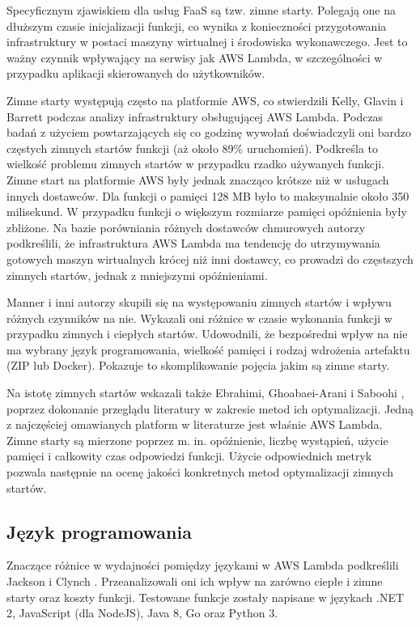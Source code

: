Specyficznym zjawiskiem dla usług FaaS są tzw. zimne starty. 
Polegają one na dłuższym czasie inicjalizacji funkcji, co wynika z konieczności przygotowania infrastruktury w postaci maszyny wirtualnej i środowiska wykonawczego. 
Jest to ważny czynnik wpływający na serwisy jak AWS Lambda, w szczególności w przypadku aplikacji skierowanych do użytkowników.

Zimne starty występują często na platformie AWS, co stwierdzili Kelly, Glavin i Barrett \cite{9284261} podczas analizy infrastruktury obsługującej AWS Lambda. 
Podczas badań z użyciem powtarzających się co godzinę wywołań doświadczyli oni bardzo częstych zimnych startów funkcji (aż około 89\% uruchomień). 
Podkreśla to wielkość problemu zimnych startów w przypadku rzadko używanych funkcji. 
Zimne start na platformie AWS były jednak znacząco krótsze niż w usługach innych dostawców. 
Dla funkcji o pamięci 128 MB było to maksymalnie około 350 milisekund. 
W przypadku funkcji o większym rozmiarze pamięci opóźnienia były zbliżone. 
Na bazie porówniania różnych dostawców chmurowych autorzy podkreślili, że infrastruktura AWS Lambda ma tendencję do utrzymywania gotowych maszyn wirtualnych krócej niż inni dostawcy, co prowadzi do częstszych zimnych startów, jednak z mniejszymi opóźnieniami.

Manner i inni autorzy \cite{8605777} skupili się na występowaniu zimnych startów i wpływu różnych czynników na nie. 
Wykazali oni różnice w czasie wykonania funkcji w przypadku zimnych i ciepłych startów. 
Udowodnili, że bezpośredni wpływ na nie ma wybrany język programowania, wielkość pamięci i rodzaj wdrożenia artefaktu (ZIP lub Docker). 
Pokazuje to skomplikowanie pojęcia jakim są zimne starty.

Na istotę zimnych startów wskazali także Ebrahimi, Ghoabaei-Arani i Saboohi \cite{EBRAHIMI2024103115}, poprzez dokonanie przeglądu literatury w zakresie metod ich optymalizacji. 
Jedną z najczęściej omawianych platform w literaturze jest właśnie AWS Lambda. 
Zimne starty są mierzone poprzez m. in. opóźnienie, liczbę wystąpień, użycie pamięci i całkowity czas odpowiedzi funkcji. 
Użycie odpowiednich metryk pozwala następnie na ocenę jakości konkretnych metod optymalizacji zimnych startów.

\subsection*{Język programowania}

Znaczące różnice w wydajności pomiędzy językami w AWS Lambda podkreślili Jackson i Clynch  \cite{8605773}. Przeanalizowali oni ich wpływ na zarówno ciepłe i zimne starty oraz koszty funkcji. Testowane funkcje zostały napisane w językach .NET 2, JavaScript (dla NodeJS), Java 8, Go oraz Python 3. 

